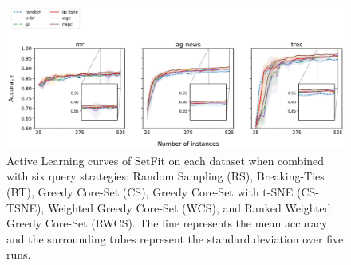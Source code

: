 \documentclass[english,bachelor,ul]{webisthesis} %
\begin{document}
\begin{figure}[htbp]
    \centering
    \includegraphics[width=1\textwidth]{img/setfit-plots-1.png}
    \caption{Active Learning curves of SetFit on each dataset when combined with six query strategies: Random Sampling (RS), Breaking-Ties (BT), Greedy Core-Set (CS), Greedy Core-Set with t-SNE (CS-TSNE), Weighted Greedy Core-Set (WCS), and Ranked Weighted Greedy Core-Set (RWCS). The line represents the mean accuracy and the surrounding tubes represent the standard deviation over five runs.}
    \label{fig:setfit-curves}
\end{figure}

\end{document}
